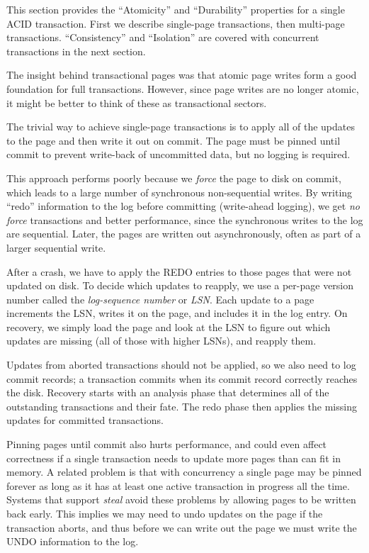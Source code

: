 \documentclass[letterpaper,twocolumn,10pt]{article}
\begin{document}
This section provides the ``Atomicity'' and ``Durability'' properties
for a single ACID transaction.
First we describe single-page transactions, then multi-page transactions.
``Consistency'' and ``Isolation'' are covered with 
concurrent transactions in the next section.

The insight behind transactional pages was
that atomic page writes form a good foundation for full transactions.
However, since page writes are no longer atomic, it might be
better to think of these as transactional sectors.

The trivial way to achieve single-page transactions is to apply all of
the updates to the page and then write it out on commit.  The page
must be pinned until commit to prevent write-back of uncommitted data,
but no logging is required.

This approach performs poorly because we {\em force} the page to disk
on commit, which leads to a large number of synchronous non-sequential
writes.  By writing ``redo'' information to the log before committing
(write-ahead logging), we get {\em no force} transactions and better
performance, since the synchronous writes to the log are sequential.
Later, the pages are written out asynchronously, often
as part of a larger sequential write.

After a crash, we have to apply the REDO entries to those pages that
were not updated on disk.  To decide which updates to reapply, we use
a per-page version number called the {\em log-sequence number} or
{\em LSN}. Each update to a page increments the LSN, writes it on the
page, and includes it in the log entry.  On recovery, we simply
load the page and look at the LSN to figure out which updates are missing
(all of those with higher LSNs), and reapply them.

Updates from aborted transactions should not be applied, so we also
need to log commit records; a transaction commits when its commit
record correctly reaches the disk. Recovery starts with an analysis
phase that determines all of the outstanding transactions and their
fate.  The redo phase then applies the missing updates for committed
transactions.

Pinning pages until commit also hurts performance, and could even
affect correctness if a single transaction needs to update more pages
than can fit in memory. A related problem is that with concurrency a
single page may be pinned forever as long as it has at least one
active transaction in progress all the time.  Systems that support
{\em steal} avoid these problems by allowing pages to be written back
early.  This implies we may need to undo updates on the page if the
transaction aborts, and thus before we can write out the page we must
write the UNDO information to the log. 
\end{document}
